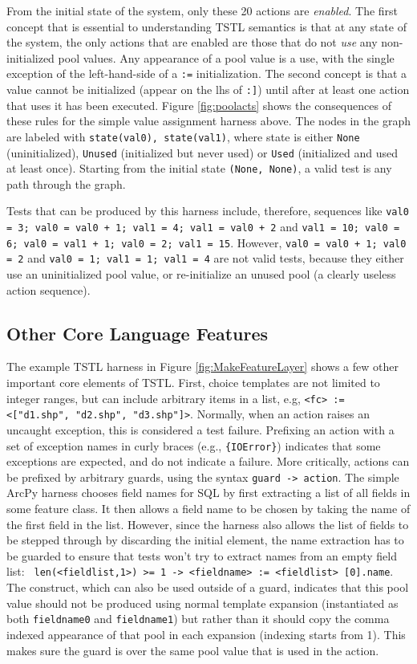 From the initial state of the system, only these 20 actions are
\emph{enabled}.  The first concept that is essential to understanding
TSTL semantics is that at any state of the
system, the only actions that are enabled are those that do not
\emph{use} any non-initialized pool values.  Any appearance of a pool
value is a use, with the single exception of the left-hand-side of a
{\tt :=} initialization.  The second concept is that a value
cannot be initialized (appear on the lhs of {\tt :]}) until after at
least one action
that uses it has been executed.  Figure \ref{fig:poolacts} shows the
consequences of these rules for the simple value assignment harness
above.  The nodes in the graph are labeled with {\tt state(val0),
  state(val1)}, where state is
either {\tt None} (uninitialized), {\tt Unused} (initialized
but never used) or {\tt Used} (initialized and used at least once).
Starting from the initial state {\tt (None, None)}, a valid test is any path
through the graph. 

Tests that can be produced by this harness include, therefore,
sequences like  {\tt val0 = 3; val0 = val0 + 1; val1 = 4; val1 = val0
  + 2} and {\tt val1 = 10; val0 = 6; val0 = val1 + 1; val0 = 2; val1 =
  15}.  However, {\tt val0 = val0 + 1; val0 = 2} and
{\tt val0 = 1; val1 = 1; val1 = 4} are not valid tests, because they
either use an uninitialized pool value, or re-initialize an unused
pool (a clearly useless action sequence).

\subsection{Other Core Language Features}

The example TSTL harness in Figure \ref{fig:MakeFeatureLayer} shows a
few other important core elements of TSTL.  First, choice templates
are not limited to integer ranges, but can include arbitrary items in
a list, e.g, {\tt <fc> := <["d1.shp", "d2.shp", "d3.shp"]>}.
Normally, when an action raises an uncaught exception, this is
considered a test failure.  Prefixing an action with a set of
exception names in curly braces (e.g., {\tt \{IOError\}}) indicates
that some exceptions are expected, and do not indicate a failure.
More critically, actions can be prefixed by arbitrary guards, using
the syntax {\tt guard -> action}.  The simple ArcPy harness chooses
field names for SQL by first extracting a list of all fields in some
feature class.  It then allows a field name to be chosen by taking the
name of the first field in the list.  However, since the harness also
allows the list of fields to be stepped through by discarding the
initial element, the name extraction has to be guarded to ensure that
tests won't try to extract names from an empty field list:  {\tt
  len(<fieldlist,1>) >= 1 -> <fieldname> := <fieldlist> [0].name}.
The {\tt <fieldlist,1>} construct, which can also be used outside of a
guard, indicates that this pool value should not be produced using
normal template expansion (instantiated as both {\tt fieldname0} and
{\tt fieldname1}) but rather than it should copy the comma indexed
appearance of that pool in each expansion (indexing starts from 1).  This makes sure the guard
is over the same pool value that is used in the action.

